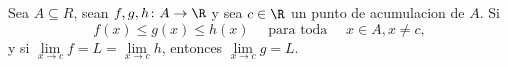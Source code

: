 


\begin{proposition}
	Sea \(A \subseteq R \), sean \(f,g,h \colon A \to \R \) y sea \(c \in \R \) un punto de acumulacion de \(A \). Si
	\[
		f(x) \leq g(x) \leq h(x) \quad \text{ para toda }\quad x \in A, x \neq c,
	\]
	y si \(\lim\limits_{x  \to c } f = L = \lim\limits_{x  \to c } h \), entonces \(\lim\limits_{x  \to c } g = L \).
\end{proposition}

